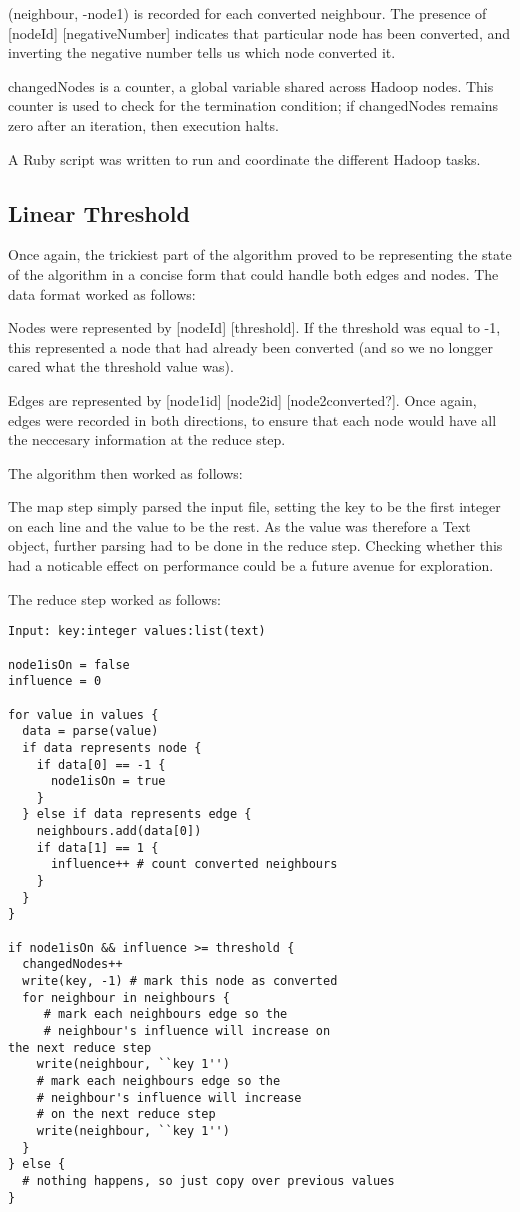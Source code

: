 (neighbour, -node1) is recorded for each converted neighbour. The presence of [nodeId] [negativeNumber] indicates that particular node has been converted, and inverting the negative number tells us which node converted it.

changedNodes is a counter, a global variable shared across Hadoop nodes. This counter is used to check for the termination condition; if changedNodes remains zero after an iteration, then execution halts.

A Ruby script was written to run and coordinate the different Hadoop tasks.

\subsection{Linear Threshold}

Once again, the trickiest part of the algorithm proved to be representing the state of the algorithm in a concise form that could handle both edges and nodes. The data format worked as follows:

Nodes were represented by [nodeId] [threshold]. If the threshold was equal to -1, this represented a node that had already been converted (and so we no longger cared what the threshold value was).

Edges are represented by [node1id] [node2id] [node2converted?]. Once again, edges were recorded in both directions, to ensure that each node would have all the neccesary information at the reduce step.

The algorithm then worked as follows:

The map step simply parsed the input file, setting the key to be the first integer on each line and the value to be the rest. As the value was therefore a Text object, further parsing had to be done in the reduce step. Checking whether this had a noticable effect on performance could be a future avenue for exploration.

The reduce step worked as follows:

\begin{verbatim}
Input: key:integer values:list(text)

node1isOn = false
influence = 0

for value in values {
  data = parse(value)
  if data represents node {
    if data[0] == -1 {
      node1isOn = true
    }
  } else if data represents edge {
    neighbours.add(data[0])
    if data[1] == 1 {
      influence++ # count converted neighbours
    }
  }
}

if node1isOn && influence >= threshold {
  changedNodes++
  write(key, -1) # mark this node as converted
  for neighbour in neighbours {
     # mark each neighbours edge so the 
     # neighbour's influence will increase on
the next reduce step
    write(neighbour, ``key 1'')
  	# mark each neighbours edge so the 
  	# neighbour's influence will increase 
  	# on the next reduce step
    write(neighbour, ``key 1'') 
  }
} else {
  # nothing happens, so just copy over previous values
}
\end{verbatim}

